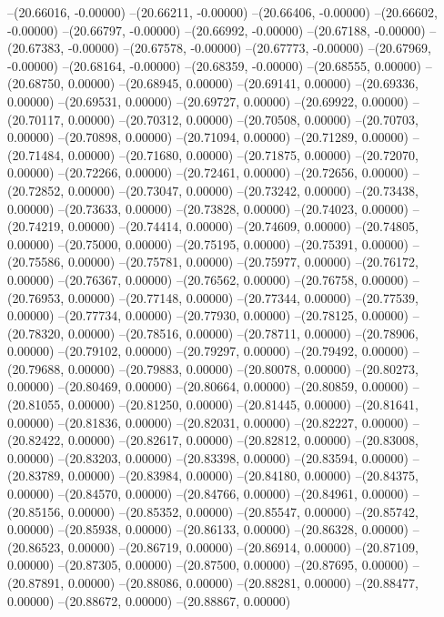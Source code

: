 --(20.66016, -0.00000)
--(20.66211, -0.00000)
--(20.66406, -0.00000)
--(20.66602, -0.00000)
--(20.66797, -0.00000)
--(20.66992, -0.00000)
--(20.67188, -0.00000)
--(20.67383, -0.00000)
--(20.67578, -0.00000)
--(20.67773, -0.00000)
--(20.67969, -0.00000)
--(20.68164, -0.00000)
--(20.68359, -0.00000)
--(20.68555, 0.00000)
--(20.68750, 0.00000)
--(20.68945, 0.00000)
--(20.69141, 0.00000)
--(20.69336, 0.00000)
--(20.69531, 0.00000)
--(20.69727, 0.00000)
--(20.69922, 0.00000)
--(20.70117, 0.00000)
--(20.70312, 0.00000)
--(20.70508, 0.00000)
--(20.70703, 0.00000)
--(20.70898, 0.00000)
--(20.71094, 0.00000)
--(20.71289, 0.00000)
--(20.71484, 0.00000)
--(20.71680, 0.00000)
--(20.71875, 0.00000)
--(20.72070, 0.00000)
--(20.72266, 0.00000)
--(20.72461, 0.00000)
--(20.72656, 0.00000)
--(20.72852, 0.00000)
--(20.73047, 0.00000)
--(20.73242, 0.00000)
--(20.73438, 0.00000)
--(20.73633, 0.00000)
--(20.73828, 0.00000)
--(20.74023, 0.00000)
--(20.74219, 0.00000)
--(20.74414, 0.00000)
--(20.74609, 0.00000)
--(20.74805, 0.00000)
--(20.75000, 0.00000)
--(20.75195, 0.00000)
--(20.75391, 0.00000)
--(20.75586, 0.00000)
--(20.75781, 0.00000)
--(20.75977, 0.00000)
--(20.76172, 0.00000)
--(20.76367, 0.00000)
--(20.76562, 0.00000)
--(20.76758, 0.00000)
--(20.76953, 0.00000)
--(20.77148, 0.00000)
--(20.77344, 0.00000)
--(20.77539, 0.00000)
--(20.77734, 0.00000)
--(20.77930, 0.00000)
--(20.78125, 0.00000)
--(20.78320, 0.00000)
--(20.78516, 0.00000)
--(20.78711, 0.00000)
--(20.78906, 0.00000)
--(20.79102, 0.00000)
--(20.79297, 0.00000)
--(20.79492, 0.00000)
--(20.79688, 0.00000)
--(20.79883, 0.00000)
--(20.80078, 0.00000)
--(20.80273, 0.00000)
--(20.80469, 0.00000)
--(20.80664, 0.00000)
--(20.80859, 0.00000)
--(20.81055, 0.00000)
--(20.81250, 0.00000)
--(20.81445, 0.00000)
--(20.81641, 0.00000)
--(20.81836, 0.00000)
--(20.82031, 0.00000)
--(20.82227, 0.00000)
--(20.82422, 0.00000)
--(20.82617, 0.00000)
--(20.82812, 0.00000)
--(20.83008, 0.00000)
--(20.83203, 0.00000)
--(20.83398, 0.00000)
--(20.83594, 0.00000)
--(20.83789, 0.00000)
--(20.83984, 0.00000)
--(20.84180, 0.00000)
--(20.84375, 0.00000)
--(20.84570, 0.00000)
--(20.84766, 0.00000)
--(20.84961, 0.00000)
--(20.85156, 0.00000)
--(20.85352, 0.00000)
--(20.85547, 0.00000)
--(20.85742, 0.00000)
--(20.85938, 0.00000)
--(20.86133, 0.00000)
--(20.86328, 0.00000)
--(20.86523, 0.00000)
--(20.86719, 0.00000)
--(20.86914, 0.00000)
--(20.87109, 0.00000)
--(20.87305, 0.00000)
--(20.87500, 0.00000)
--(20.87695, 0.00000)
--(20.87891, 0.00000)
--(20.88086, 0.00000)
--(20.88281, 0.00000)
--(20.88477, 0.00000)
--(20.88672, 0.00000)
--(20.88867, 0.00000)
